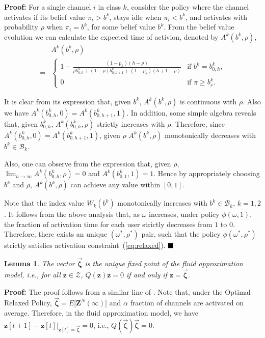\documentclass[11pt,twocolumn]{IEEEtran}
\newtheorem{lemma}{Lemma}
\begin{document}
\noindent \textbf{Proof:}
For a single channel $i$ in class $k$, consider the policy where the channel activates if its belief value $\pi_i>b^k$, stays idle when $\pi_i<b^k$, and activates with probability $\rho$ when $\pi_i=b^k$, for some belief value $b^k$. From the belief value evolution we can calculate the expected time of activion, denoted by $A^k(b^k, \rho)$,
\begin{align}
&A^k(b^k, \rho)\nonumber\\
\nonumber=&\begin{cases}
1-\frac{(1-p_k)(h-\rho)}{\rho b^k_{0,h}+(1-\rho)b^k_{0,h+1}+(1-p_k)(h+1-\rho)} &\text{if $b^k=b^k_{0,h}$,} \\
0 &\text{if $\pi \geq b^k_s$.}
\end{cases}
\end{align}

It is clear from its expression that, given $b^k$, $A^k(b^k, \rho)$ is continuous with $\rho$. Also we have $A^k(b^k_{0,h}, 0)=A^k(b^k_{0,h+1}, 1)$. In addition, some simple algebra reveals that, given $b^k_{0,h}$, $A^k(b^k_{0,h}, \rho)$ strictly increases with $\rho$. Therefore, since $A^k(b^k_{0,h}, 0)=A^k(b^k_{0,h+1}, 1)$, given $\rho$ $A^k(b^k, \rho)$ monotonically decreases with $b^k\in\mathcal{B}_k$.

Also, one can observe from the expression that, given $\rho$, $\lim_{h\rightarrow \infty} A^k(b^k_{0,h}, \rho)=0$ and $ A^k(b^k_{0,1}, 1)=1$. Hence by appropriately choosing $b^k$ and $\rho$, $A^k(b^k, \rho)$ can achieve any value within $[0,1]$.
\vspace{3pt}

Note that the index value $W_k(b^k)$ monotonically increases with $b^k \in \mathcal{B}_k$, $k=1,2$.  It follows from the above analysis that, as $\omega$ increases, under policy $\phi(\omega,1)$, the fraction of activation time for each user strictly decreases from $1$ to $0$. Therefore, there exists an unique $(\omega^*, \rho^*)$ pair, such that the policy $\phi(\omega^*, \rho^*)$ strictly satisfies activation constraint~(\ref{eq:relaxed}). $\hfill \blacksquare$


\begin{lemma}
\label{lemma:fixpt}
The vector $\vec{\bm \zeta}$ is the unique fixed point of the fluid approximation model, i.e., for all $\bm z \in \mathcal{Z}$,
$Q(\bm z)\bm z=0$ if and only if $\bm z=\vec{\bm \zeta}$.
\end{lemma}

\noindent \textbf{Proof:} The proof follows from a similar line of \cite{Weber}. Note that, under the Optimal Relaxed Policy, $\vec{\bm \zeta}=E\big[{\bm Z}^N(\infty)\big]$ and $\alpha$ fraction of channels are activated on average. Therefore, in the fluid approximation model, we have $\bm z[t+1]-\bm z[t] \big|_{\bm z[t]=\vec{\bm \zeta}} =0$, i.e., $Q(\vec{\bm \zeta})\vec{\bm \zeta}=0$.
\end{document}

